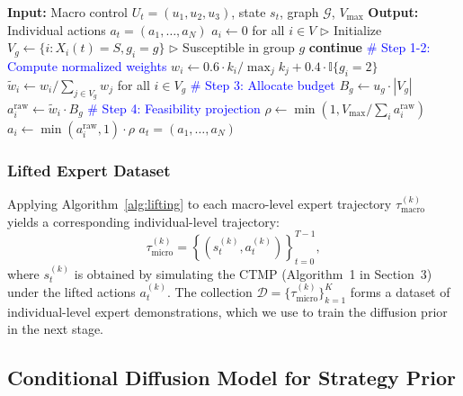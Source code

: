 \begin{algorithm}[t]
\caption{Macro-to-Micro Lifting Algorithm}
\label{alg:lifting}
\begin{algorithmic}[1]
\STATE \textbf{Input:} Macro control $U_t = (u_1, u_2, u_3)$, state $s_t$, graph $\mathcal{G}$, $V_{\max}$
\STATE \textbf{Output:} Individual actions $a_t = (a_1, \ldots, a_N)$
\STATE
\STATE $a_i \gets 0$ for all $i \in V$ \hfill $\triangleright$ Initialize
    \STATE $V_g \gets \{i : X_i(t)=S, g_i=g\}$ \hfill $\triangleright$ Susceptible in group $g$
        \STATE \textbf{continue}
    \ENDIF
    \STATE
    \STATE \textcolor{blue}{\# Step 1-2: Compute normalized weights}
        \STATE $w_i \gets 0.6 \cdot k_i / \max_j k_j + 0.4 \cdot \mathbb{I}\{g_i=2\}$
    \ENDFOR
    \STATE $\tilde{w}_i \gets w_i / \sum_{j \in V_g} w_j$ for all $i \in V_g$
    \STATE
    \STATE \textcolor{blue}{\# Step 3: Allocate budget}
    \STATE $B_g \gets u_g \cdot |V_g|$
        \STATE $a_i^{\text{raw}} \gets \tilde{w}_i \cdot B_g$
    \ENDFOR
\ENDFOR
\STATE
\STATE \textcolor{blue}{\# Step 4: Feasibility projection}
\STATE $\rho \gets \min(1, V_{\max} / \sum_i a_i^{\text{raw}})$
    \STATE $a_i \gets \min(a_i^{\text{raw}}, 1) \cdot \rho$
\ENDFOR
\RETURN $a_t = (a_1, \ldots, a_N)$
\end{algorithmic}
\end{algorithm}

\subsubsection{Lifted Expert Dataset}

Applying Algorithm~\ref{alg:lifting} to each macro-level expert trajectory
$\tau_{\text{macro}}^{(k)}$ yields a corresponding individual-level trajectory:
\begin{equation}
\tau_{\text{micro}}^{(k)} = \left\{
(s_t^{(k)}, a_t^{(k)})
\right\}_{t=0}^{T-1},
\end{equation}
where $s_t^{(k)}$ is obtained by simulating the CTMP (Algorithm~1 in Section~3) under
the lifted actions $a_t^{(k)}$. The collection
$\mathcal{D} = \{\tau_{\text{micro}}^{(k)}\}_{k=1}^K$ forms a dataset of individual-level
expert demonstrations, which we use to train the diffusion prior in the next stage.


\subsection{Conditional Diffusion Model for Strategy Prior}
\label{sec:diffusion}

